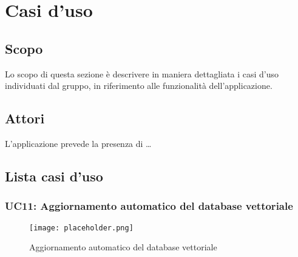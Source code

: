 
\section{Casi d'uso}
\label{sec:casi_uso}

\subsection{Scopo}

Lo scopo di questa sezione è descrivere in maniera dettagliata i casi d’uso individuati dal
gruppo, in riferimento alle funzionalità dell’applicazione.


\subsection{Attori}

L’applicazione prevede la presenza di \dots


\subsection{Lista casi d'uso}



\subsubsection{UC11: Aggiornamento automatico del database vettoriale}

\begin{figure}[h]
    \centering
    \texttt{[image: placeholder.png]}
    \caption{Aggiornamento automatico del database vettoriale}
\end{figure}

